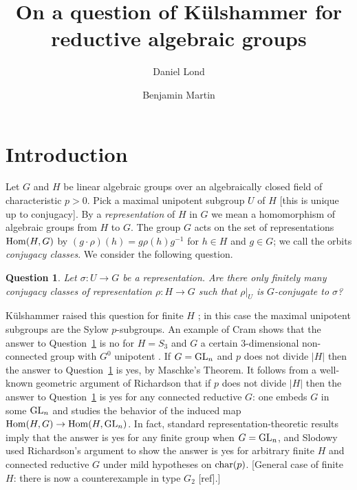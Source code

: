 \documentclass[12pt]{amsart}
\title[On a question of K\"ulshammer for reductive algebraic groups]
{On a question of K\"ulshammer for reductive algebraic groups}
\author[D. Lond]{Daniel Lond}
\author[B.\ Martin]{Benjamin Martin}
\newcommand\ra{\rightarrow}
\numberwithin{equation}{section}
\newtheorem{qn}[equation]{Question}
\theoremstyle{definition}
\theoremstyle{remark}
\theoremstyle{remark}
\begin{document}
\begin{abstract}
\end{abstract}


\maketitle

\section{Introduction}

Let $G$ and $H$ be linear algebraic groups over an algebraically closed field of characteristic $p> 0$.  Pick a maximal unipotent subgroup $U$ of $H$ [this is unique up to conjugacy].  By a {\em representation} of $H$ in $G$ we mean a homomorphism of algebraic groups from $H$ to $G$.  The group $G$ acts on the set of representations ${\rm Hom}(H,G)$ by $(g\cdot \rho)(h)= g\rho(h)g^{-1}$ for $h\in H$ and $g\in G$; we call the orbits {\em conjugacy classes}.  We consider the following question.

\begin{qn}
\label{qn:algKQ}
 Let $\sigma\colon U\ra G$ be a representation.  Are there only finitely many conjugacy classes of representation $\rho\colon H\ra G$ such that $\rho|_U$ is $G$-conjugate to $\sigma$?
\end{qn}

K\"ulshammer raised this question for finite $H$
\cite{kulshammer1995donovan}; in this case the maximal unipotent subgroups are the Sylow $p$-subgroups.  An example of Cram shows that the answer to Question~\ref{qn:algKQ} is no for $H= S_3$ and $G$ a certain 3-dimensional non-connected group with $G^0$ unipotent \cite[Appendix]{slodowy1997two}.
If $G= {\rm GL}_n$ and $p$ does not divide $|H|$ then the answer to Question~\ref{qn:algKQ} is yes, by Maschke's Theorem.  It follows from a well-known geometric argument of Richardson that if $p$ does not divide $|H|$ then the answer to Question~\ref{qn:algKQ} is yes for any connected reductive $G$: one embeds $G$ in some ${\rm GL}_n$ and studies the behavior of the induced map ${\rm Hom}(H,G)\ra {\rm Hom}(H,{\rm GL}_n)$.  In fact, standard representation-theoretic results imply that the answer is yes for any finite group when $G= {\rm GL}_n$, and Slodowy used Richardson's argument to show the answer is yes for arbitrary finite $H$ and connected reductive $G$ under mild hypotheses on ${\rm char}(p)$.  [General case of finite $H$: there is now a counterexample in type $G_2$ [ref].]
\end{document}
